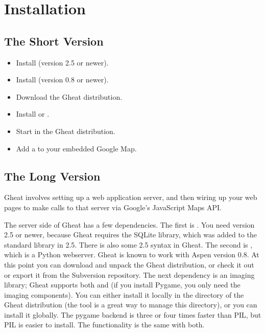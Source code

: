 \documentclass{manual}
\begin{document}
\chapter{Installation}
\label{installation}

\section{The Short Version}

\begin{itemize}
\item{Install  (version 2.5 or newer).}
\item{Install  (version 0.8 or newer).}
\item{Download the Gheat distribution.}
\item{Install  or .}
\item{Start  in the Gheat distribution.}
\item{Add a  to your embedded Google Map.}
\end{itemize}


\section{The Long Version}

Gheat involves setting up a web application server, and then wiring up your
web pages to make calls to that server via Google's JavaScript Maps API.

The server side of Gheat has a few dependencies. The first is
. You need version 2.5 or newer, because
Gheat requires the SQLite library, which was added to the standard library in
2.5. There is also some 2.5 syntax in Gheat.  The second is
, which is a Python
webserver. Gheat is known to work with Aspen version 0.8. At this point you can
download and unpack the Gheat distribution, or check it out or export it from
the Subversion repository. The next dependency is an imaging library; Gheat
supports both  and
 (if you install Pygame,
you only need the imaging components). You can either install it locally in the
\file{__} directory of the Gheat distribution (the
 tool is a great way
to manage this directory), or you can install it globally. The pygame backend
is three or four times faster than PIL, but PIL is easier to install.  The
functionality is the same with both.
\end{document}
